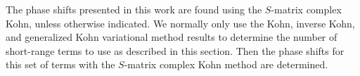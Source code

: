 \documentclass[Dissertation.tex]{subfiles}
\begin{document}
The phase shifts presented in this work are found using the $S$-matrix 
complex Kohn, unless otherwise indicated. We normally only use the Kohn, 
inverse Kohn, and generalized Kohn variational method results to determine 
the number of short-range terms to use as described in this section. Then the 
phase shifts for this set of terms with the $S$-matrix complex Kohn method 
are determined.




\end{document}
